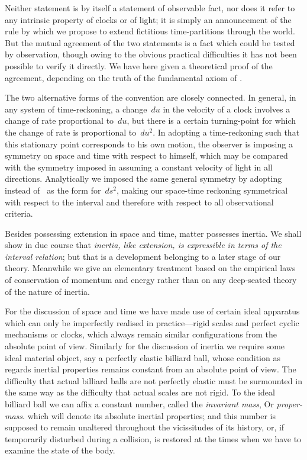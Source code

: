 \documentclass[12pt]{book}
\begin{document}
Neither statement is by itself a statement of observable fact, nor does it
refer to any intrinsic property of clocks or of light; it is simply an announcement
of the rule by which we propose to extend fictitious time\hyp{}partitions
through the world. But the mutual agreement of the two statements is a fact
which could be tested by observation, though owing to the obvious practical
difficulties it has not been possible to verify it directly. We have here given
a theoretical proof of the agreement, depending on the truth of the fundamental
axiom of .

The two alternative forms of the convention are closely connected. In
general, in any system of time\hyp{}reckoning, a change~$du$ in the velocity of a
clock involves a change of rate proportional to~$du$, but there is a certain
turning\hyp{}point for which the change of rate is proportional to~$du^2$. In adopting
a time\hyp{}reckoning such that this stationary point corresponds to his own
motion, the observer is imposing a symmetry on space and time with respect
to himself, which may be compared with the symmetry imposed in assuming
a constant velocity of light in all directions. Analytically we imposed the
same general symmetry by adopting  instead of~ as the form for~$ds^2$,
making our space-time reckoning symmetrical with respect to the interval
and therefore with respect to all observational criteria.

%

Besides possessing extension in space and time, matter possesses inertia.
%
We shall show in due course that \emph{inertia, like extension, is expressible in terms
of the interval relation}; but that is a development belonging to a later stage
of our theory. Meanwhile we give an elementary treatment based on the
empirical laws of conservation of momentum and energy rather than on any
deep-seated theory of the nature of inertia.

For the discussion of space and time we have made use of certain ideal
apparatus which can only be imperfectly realised in practice---rigid scales and
perfect cyclic mechanisms or clocks, which always remain similar configurations
from the absolute point of view. Similarly for the discussion of inertia
we require some ideal material object, say a perfectly elastic billiard ball, whose
condition as regards inertial properties remains constant from an absolute
point of view. The difficulty that actual billiard balls are not perfectly elastic
must be surmounted in the same way as the difficulty that actual scales are
not rigid. To the ideal billiard ball we can affix a constant number, called
the \emph{invariant mass}\footnotemark,\footnotetext
  {Or \emph{proper\hyp{}mass}.}
which will denote its absolute inertial properties; and
%
%
%
%
this number is supposed to remain unaltered throughout the vicissitudes of
its history, or, if temporarily disturbed during a collision, is restored at the
times when we have to examine the state of the body.
\end{document}
